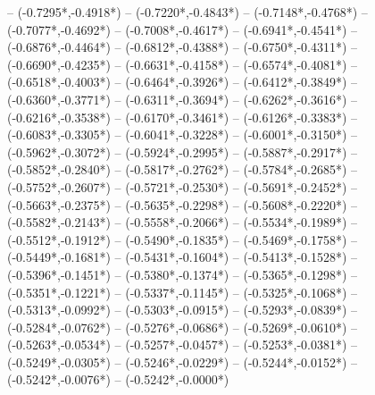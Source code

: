 {	-- ({-0.7295*\dx},{-0.4918*\dy})
	-- ({-0.7220*\dx},{-0.4843*\dy})
	-- ({-0.7148*\dx},{-0.4768*\dy})
	-- ({-0.7077*\dx},{-0.4692*\dy})
	-- ({-0.7008*\dx},{-0.4617*\dy})
	-- ({-0.6941*\dx},{-0.4541*\dy})
	-- ({-0.6876*\dx},{-0.4464*\dy})
	-- ({-0.6812*\dx},{-0.4388*\dy})
	-- ({-0.6750*\dx},{-0.4311*\dy})
	-- ({-0.6690*\dx},{-0.4235*\dy})
	-- ({-0.6631*\dx},{-0.4158*\dy})
	-- ({-0.6574*\dx},{-0.4081*\dy})
	-- ({-0.6518*\dx},{-0.4003*\dy})
	-- ({-0.6464*\dx},{-0.3926*\dy})
	-- ({-0.6412*\dx},{-0.3849*\dy})
	-- ({-0.6360*\dx},{-0.3771*\dy})
	-- ({-0.6311*\dx},{-0.3694*\dy})
	-- ({-0.6262*\dx},{-0.3616*\dy})
	-- ({-0.6216*\dx},{-0.3538*\dy})
	-- ({-0.6170*\dx},{-0.3461*\dy})
	-- ({-0.6126*\dx},{-0.3383*\dy})
	-- ({-0.6083*\dx},{-0.3305*\dy})
	-- ({-0.6041*\dx},{-0.3228*\dy})
	-- ({-0.6001*\dx},{-0.3150*\dy})
	-- ({-0.5962*\dx},{-0.3072*\dy})
	-- ({-0.5924*\dx},{-0.2995*\dy})
	-- ({-0.5887*\dx},{-0.2917*\dy})
	-- ({-0.5852*\dx},{-0.2840*\dy})
	-- ({-0.5817*\dx},{-0.2762*\dy})
	-- ({-0.5784*\dx},{-0.2685*\dy})
	-- ({-0.5752*\dx},{-0.2607*\dy})
	-- ({-0.5721*\dx},{-0.2530*\dy})
	-- ({-0.5691*\dx},{-0.2452*\dy})
	-- ({-0.5663*\dx},{-0.2375*\dy})
	-- ({-0.5635*\dx},{-0.2298*\dy})
	-- ({-0.5608*\dx},{-0.2220*\dy})
	-- ({-0.5582*\dx},{-0.2143*\dy})
	-- ({-0.5558*\dx},{-0.2066*\dy})
	-- ({-0.5534*\dx},{-0.1989*\dy})
	-- ({-0.5512*\dx},{-0.1912*\dy})
	-- ({-0.5490*\dx},{-0.1835*\dy})
	-- ({-0.5469*\dx},{-0.1758*\dy})
	-- ({-0.5449*\dx},{-0.1681*\dy})
	-- ({-0.5431*\dx},{-0.1604*\dy})
	-- ({-0.5413*\dx},{-0.1528*\dy})
	-- ({-0.5396*\dx},{-0.1451*\dy})
	-- ({-0.5380*\dx},{-0.1374*\dy})
	-- ({-0.5365*\dx},{-0.1298*\dy})
	-- ({-0.5351*\dx},{-0.1221*\dy})
	-- ({-0.5337*\dx},{-0.1145*\dy})
	-- ({-0.5325*\dx},{-0.1068*\dy})
	-- ({-0.5313*\dx},{-0.0992*\dy})
	-- ({-0.5303*\dx},{-0.0915*\dy})
	-- ({-0.5293*\dx},{-0.0839*\dy})
	-- ({-0.5284*\dx},{-0.0762*\dy})
	-- ({-0.5276*\dx},{-0.0686*\dy})
	-- ({-0.5269*\dx},{-0.0610*\dy})
	-- ({-0.5263*\dx},{-0.0534*\dy})
	-- ({-0.5257*\dx},{-0.0457*\dy})
	-- ({-0.5253*\dx},{-0.0381*\dy})
	-- ({-0.5249*\dx},{-0.0305*\dy})
	-- ({-0.5246*\dx},{-0.0229*\dy})
	-- ({-0.5244*\dx},{-0.0152*\dy})
	-- ({-0.5242*\dx},{-0.0076*\dy})
	-- ({-0.5242*\dx},{-0.0000*\dy})
}
